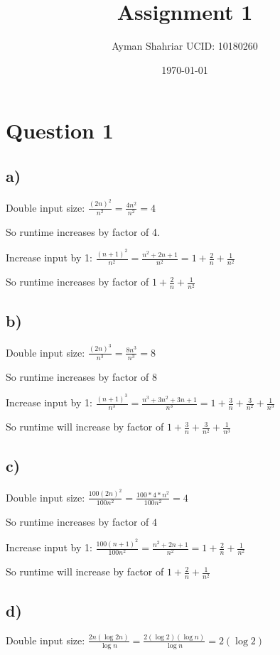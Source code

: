 \documentclass{article}
\title{Assignment 1}
\author{Ayman Shahriar      UCID: 10180260 }
\date{\today}
\begin{document}
\maketitle

\raggedright

\setlength{\parskip}{0.8em}  %

\section*{Question 1}

\subsection*{a)}
Double input size: $\frac{(2n)^2}{n^2} = \frac{4n^2}{n^2} = 4$

So runtime increases by factor of 4.

Increase input by 1: $\frac{(n+1)^2}{n^2} = \frac{n^2+2n+1}{n^2} = 1+\frac{2}{n}+\frac{1}{n^2}$

So runtime increases by factor of $1+\frac{2}{n}+\frac{1}{n^2}$


\subsection*{b)}
Double input size: $\frac{(2n)^3}{n^3} = \frac{8n^3}{n^3} = 8$

So runtime increases by factor of $8$

Increase input by 1: $\frac{(n+1)^3}{n^3} = \frac{n^3+3n^2+3n+1}{n^3} = 1+\frac{3}{n} + \frac{3}{n^2} + \frac{1}{n^3}$

So runtime will increase by factor of $1+\frac{3}{n} + \frac{3}{n^2} + \frac{1}{n^3}$


\subsection*{c)}
Double input size: $\frac{100(2n)^2}{100n^2} = \frac{100*4*n^2}{100n^2} = 4$

So runtime increases by factor of $4$

Increase input by 1: $\frac{100(n+1)^2}{100n^2} = \frac{n^2+2n+1}{n^2} = 1+ \frac{2}{n} + \frac{1}{n^2}$

So runtime will increase by factor of $1+ \frac{2}{n} + \frac{1}{n^2}$



\subsection*{d)}
Double input size: $\frac{2n(\log2n)}{\log n} = \frac{2 (\log 2) (\log n)}{\log n} = 2 (\log 2)$
\end{document}
